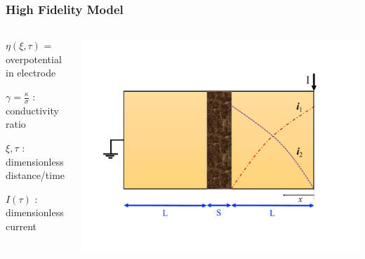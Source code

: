 \documentclass[10pt,xcolor=dvipsnames,compress]{beamer}
\begin{document}
\begin{frame}
\frametitle{High Fidelity Model}
\vfill

\begin{columns}
\begin{column}{.47\textwidth}
\begin{itemize}
\begin{small}
\item $\eta(\xi,\tau)$ = overpotential in electrode\\
\item $\gamma = \frac{\kappa}{\sigma}$ : conductivity ratio \\
\item $\xi, \tau$ : dimensionless distance/time \\
\item $I(\tau)$ : dimensionless current
\end{small}
\end{itemize}
\end{column}
\begin{column}{.47\textwidth} 
	\includegraphics[trim = 0in 1.4in 0in 1.4in, clip, width=1\textwidth]{figs/schematic.pdf}
\end{column}
\end{columns}
\begin{columns}
\begin{column}{.47\textwidth}

\end{column}
\end{columns}
\end{frame}
\end{document}
